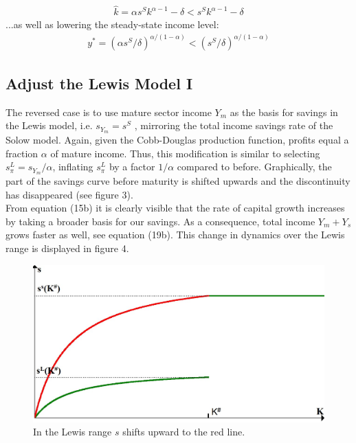 \documentclass[a4paper]{article}
\begin{document}
\begin{align}
\hat{k}={\alpha}s^{S}k^{\alpha-1}-\delta<s^{S}k^{\alpha-1}-\delta
\end{align}
...as well as lowering the steady-state income level:
\begin{align}
y^*=({\alpha}s^{S}/\delta)^{\alpha/({1-\alpha})}<(s^{S}/\delta)^{\alpha/({1-\alpha})}
\end{align}
\subsection{Adjust the Lewis Model I}
The reversed case is to use mature sector income $Y_m$ as the basis for savings in the Lewis model, i.e. $s_{Y_m}=s^S$ , mirroring the total income savings rate of the Solow model. Again, given the Cobb-Douglas production function, profits equal a fraction ${\alpha}$ of mature income. Thus, this modification is similar to selecting $s_{\pi}^L=s_{Y_m}/{\alpha}$, inflating $s_{\pi}^L$ by a factor $1/{\alpha}$ compared to before. Graphically, the part of the savings curve before maturity is shifted upwards and the discontinuity has disappeared (see figure 3).\\
From equation (15b) it is clearly visible that the rate of capital growth increases by taking a broader basis for our savings. As a consequence, total income $Y_m+Y_s$ grows faster as well, see equation (19b). This change in dynamics over the Lewis range is displayed in figure 4.
\begin{figure}[!ht]
\includegraphics[width=\textwidth]{EndoSavings2.jpg}
\caption{In the Lewis range $s$ shifts upward to the red line.}
\end{figure}\\
\end{document}

